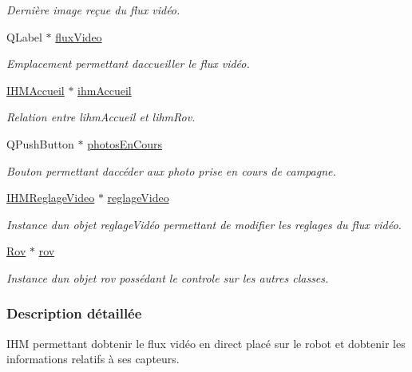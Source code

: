 \begin{DoxyCompactItemize}
\begin{DoxyCompactList}\small\item\em Dernière image reçue du flux vidéo. \end{DoxyCompactList}\item 
Q\+Label $\ast$ \hyperlink{class_i_h_m_rov_acdeabe02e1431b5c1817cb2a89debd0a}{flux\+Video}
\begin{DoxyCompactList}\small\item\em Emplacement permettant d\textquotesingle{}accueiller le flux vidéo. \end{DoxyCompactList}\item 
\hyperlink{class_i_h_m_accueil}{I\+H\+M\+Accueil} $\ast$ \hyperlink{class_i_h_m_rov_aa22f6fe8daf5c67071ec02a348e5cc3e}{ihm\+Accueil}
\begin{DoxyCompactList}\small\item\em Relation entre l\textquotesingle{}ihm\+Accueil et l\textquotesingle{}ihm\+Rov. \end{DoxyCompactList}\item 
Q\+Push\+Button $\ast$ \hyperlink{class_i_h_m_rov_a0896dea1a2d901a7cf43a344e22fc66d}{photos\+En\+Cours}
\begin{DoxyCompactList}\small\item\em Bouton permettant d\textquotesingle{}accéder aux photo prise en cours de campagne. \end{DoxyCompactList}\item 
\hyperlink{class_i_h_m_reglage_video}{I\+H\+M\+Reglage\+Video} $\ast$ \hyperlink{class_i_h_m_rov_a6baa53853d29151404e6ae3dec5d2003}{reglage\+Video}
\begin{DoxyCompactList}\small\item\em Instance d\textquotesingle{}un objet reglage\+Vidéo permettant de modifier les reglages du flux vidéo. \end{DoxyCompactList}\item 
\hyperlink{class_rov}{Rov} $\ast$ \hyperlink{class_i_h_m_rov_a777ca33fdb295ba6b6773e880356fa1e}{rov}
\begin{DoxyCompactList}\small\item\em Instance d\textquotesingle{}un objet rov possédant le controle sur les autres classes. \end{DoxyCompactList}\end{DoxyCompactItemize}


\subsubsection{Description détaillée}
I\+HM permettant d\textquotesingle{}obtenir le flux vidéo en direct placé sur le robot et d\textquotesingle{}obtenir les informations relatifs à ses capteurs. 

